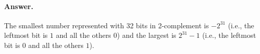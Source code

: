 \paragraph{Answer.} The smallest number represented with 32 bits in
2-complement is \(-2^{31}\) (i.e., the leftmost bit is \(1\) and all
the others \(0\)) and the largest is \(2^{31} - 1\) (i.e., the
leftmost bit is \(0\) and all the others \(1\)).
